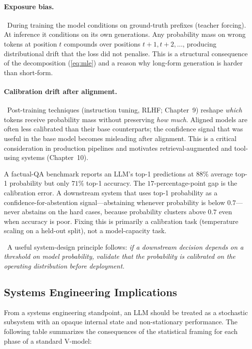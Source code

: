 \paragraph{Exposure bias.}
\Cons\ During training the model conditions on ground-truth prefixes
(teacher forcing). At inference it conditions on its own generations.
Any probability mass on wrong tokens at position $t$ compounds over
positions $t+1, t+2, \ldots$, producing distributional drift that the
loss did not penalise. This is a structural consequence of the
decomposition (\ref{eq:mle}) and a reason why long-form generation is
harder than short-form.

\paragraph{Calibration drift after alignment.}
\Emp\ Post-training techniques (instruction tuning, RLHF; Chapter~9)
reshape \emph{which} tokens receive probability mass without preserving
\emph{how much}. Aligned models are often less calibrated than their
base counterparts; the confidence signal that was useful in the base
model becomes misleading after alignment. This is a critical
consideration in production pipelines and motivates retrieval-augmented
and tool-using systems (Chapter~10).

\begin{workedexample}
A factual-QA benchmark reports an LLM's top-1 predictions at $88\%$
average top-1 probability but only $71\%$ top-1 accuracy. The
$17$-percentage-point gap is the calibration error. A downstream
system that uses top-1 probability as a confidence-for-abstention
signal---abstaining whenever probability is below $0.7$---never
abstains on the hard cases, because probability clusters above $0.7$
even when accuracy is poor. Fixing this is primarily a calibration
task (temperature scaling on a held-out split), not a model-capacity
task.
\end{workedexample}

\Cons\ A useful system-design principle follows: \emph{if a downstream
decision depends on a threshold on model probability, validate that the
probability is calibrated on the operating distribution before
deployment.}

\subsection{Systems Engineering Implications}

From a systems engineering standpoint, an LLM should be treated as a stochastic subsystem with an opaque internal state and non-stationary performance. The following table summarizes the consequences of the statistical framing for each phase of a standard V-model:

